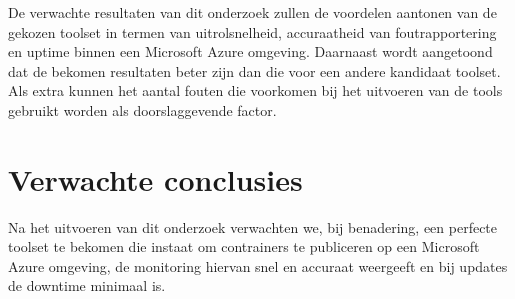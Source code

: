 De verwachte resultaten van dit onderzoek zullen de voordelen aantonen van de gekozen toolset in termen van uitrolsnelheid, accuraatheid van foutrapportering en uptime binnen een Microsoft Azure omgeving. Daarnaast wordt aangetoond dat de bekomen resultaten beter zijn dan die voor een andere kandidaat toolset. Als extra kunnen het aantal fouten die voorkomen bij het uitvoeren van de tools gebruikt worden als doorslaggevende factor.


\section{Verwachte conclusies}
\label{sec:verwachte_conclusies}

Na het uitvoeren van dit onderzoek verwachten we, bij benadering, een perfecte toolset te bekomen die instaat om contrainers te  publiceren op een Microsoft Azure omgeving, de monitoring hiervan snel en accuraat weergeeft en bij updates de downtime minimaal is.

